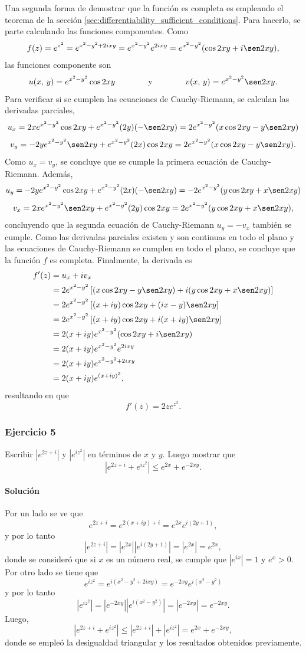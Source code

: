 \documentclass[a4paper]{report}
\begin{document}
Una segunda forma de demostrar que la función es completa es empleando el teorema de la sección \ref{sec:differentiability_sufficient_conditions}. Para hacerlo, se parte calculando las funciones componentes. Como
\[
 f(z)=e^{z^2}=e^{x^2-y^2+2ixy}=e^{x^2-y^2}e^{2ixy}=e^{x^2-y^2}(\cos2xy+i\sen2xy),
\]
las funciones componente son
\[
 u(x,\,y)=e^{x^2-y^2}\cos2xy
 \qquad\qquad\textrm{y}\qquad\qquad
 v(x,\,y)=e^{x^2-y^2}\sen2xy.
\]
Para verificar si se cumplen las ecuaciones de Cauchy-Riemann, se calculan las derivadas parciales,
\[
 u_x=2xe^{x^2-y^2}\cos2xy+e^{x^2-y^2}(2y)(-\sen2xy)=2e^{x^2-y^2}(x\cos2xy-y\sen2xy)
\]
\[
 v_y=-2ye^{x^2-y^2}\sen2xy+e^{x^2-y^2}(2x)\cos2xy=2e^{x^2-y^2}(x\cos2xy-y\sen2xy).
\]
Como \(u_x=v_y\), se concluye que se cumple la primera ecuación de Cauchy-Riemann. Además,
\[
 u_y=-2ye^{x^2-y^2}\cos2xy+e^{x^2-y^2}(2x)(-\sen2xy)=-2e^{x^2-y^2}(y\cos2xy+x\sen2xy)
\]
\[
 v_x=2xe^{x^2-y^2}\sen2xy+e^{x^2-y^2}(2y)\cos2xy=2e^{x^2-y^2}(y\cos2xy+x\sen2xy),
\]
concluyendo que la segunda ecuación de Cauchy-Riemann \(u_y=-v_x\) también se cumple. Como las derivadas parciales existen y son continuas en todo el plano y las ecuaciones de Cauchy-Riemann se cumplen en todo el plano, se concluye que la función \(f\) es completa. Finalmente, la derivada es
\begin{align*}
 f'(z)&=u_x+iv_x\\
  &=2e^{x^2-y^2}\left[(x\cos2xy-y\sen2xy)+i(y\cos2xy+x\sen2xy)\right]\\
  &=2e^{x^2-y^2}\left[(x+iy)\cos2xy+(ix-y)\sen2xy\right]\\
  &=2e^{x^2-y^2}\left[(x+iy)\cos2xy+i(x+iy)\sen2xy\right]\\
  &=2(x+iy)e^{x^2-y^2}(\cos2xy+i\sen2xy)\\
  &=2(x+iy)e^{x^2-y^2}e^{2ixy}\\
  &=2(x+iy)e^{x^2-y^2+2ixy}\\
  &=2(x+iy)e^{(x+iy)^2},
\end{align*}
resultando en que
\[
 f'(z)=2ze^{z^2}.
\]

\subsubsection{Ejercicio 5}

Escribir \(|e^{2z+i}|\) y \(|e^{iz^2}|\) en términos de \(x\) y \(y\). Luego mostrar que 
\[
 |e^{2z+i}+e^{iz^2}|\leq e^{2x}+e^{-2xy}.
\]

\paragraph{Solución} Por un lado se ve que 
\[
 e^{2z+i}=e^{2(x+iy)+i}=e^{2x}e^{i(2y+1)},
\]
y por lo tanto
\[
 |e^{2z+i}|=|e^{2x}||e^{i(2y+1)}|=|e^{2x}|=e^{2x},
\]
donde se consideró que si \(x\) es un número real, se cumple que \(|e^{ix}|=1\) y \(e^x>0\). Por otro lado se tiene que 
\[
 e^{iz^2}=e^{i(x^2-y^2+2ixy)}=e^{-2xy}e^{i(x^2-y^2)}
\]
y por lo tanto
\[
 |e^{iz^2}|=|e^{-2xy}||e^{i(x^2-y^2)}|=|e^{-2xy}|=e^{-2xy}.
\]
Luego,
\[
 |e^{2z+i}+e^{iz^2}|\leq|e^{2z+i}|+|e^{iz^2}|=e^{2x}+e^{-2xy},
\]
donde se empleó la desigualdad triangular y los resultados obtenidos previamente.
\end{document}
